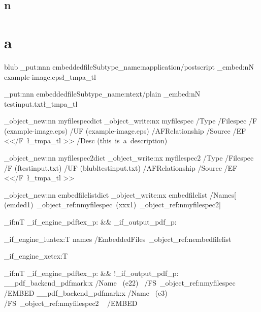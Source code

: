 \documentclass{article}
\begin{document}
\subsection{n}
\section{a}
blub
\ExplSyntaxOn
\pdfdict_put:nnn  {embeddedfile}{Subtype}{\pdftool_name:n{application/postscript}}
\pdffile_embed:nN {example-image.eps}\l_tmpa_tl

\pdfdict_put:nnn  {embeddedfile}{Subtype}{\pdftool_name:n{text/plain}}
\pdffile_embed:nN {testinput.txt}\l_tmpa_tl


\pdf_object_new:nn  {myfilespec}{dict}
\pdf_object_write:nx {myfilespec}
 {
  /Type /Filespec
  /F (example-image.eps)
  /UF (example-image.eps)
  /AFRelationship /Source
  /EF <</F~\l_tmpa_tl >>
  /Desc (this~is~a~description)
 }

\pdf_object_new:nn  {myfilespec2}{dict}
\pdf_object_write:nx {myfilespec2}
 {
  /Type /Filespec
  /F (ftestinput.txt)
  /UF (blubltestinput.txt)
  /AFRelationship /Source
  /EF <</F~\l_tmpa_tl >>
 }


\pdf_object_new:nn {embedfilelist}{dict}
\pdf_object_write:nx {embedfilelist}
 {
  /Names[ (emded1)~\pdf_object_ref:n{myfilespec}~(xxx1)~\pdf_object_ref:n{myfilespec2}]
 }

\bool_if:nT {\sys_if_engine_pdftex_p: && \sys_if_output_pdf_p:}
 {
 }

\sys_if_engine_luatex:T
 {
   \pdfextension names {/EmbeddedFiles~\pdf_object_ref:n{embedfilelist} }
 }

\sys_if_engine_xetex:T
 {
 }

\bool_if:nT {\sys_if_engine_pdftex_p: && !\sys_if_output_pdf_p:}
 {
   \__pdf_backend_pdfmark:x
     {
       /Name~ (e22)~
       /FS~\pdf_object_ref:n{myfilespec}
       ~ /EMBED
   }
   \__pdf_backend_pdfmark:x
     {
       /Name~ (e3)~
       /FS~\pdf_object_ref:n{myfilespec2}
       ~ /EMBED
   }
  }



\ExplSyntaxOff
\end{document}
